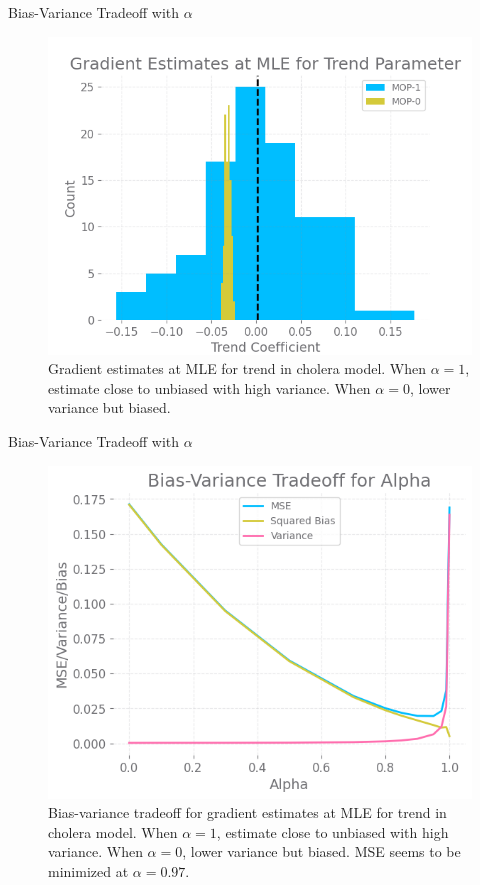 \documentclass{beamer}
\begin{document}
\begin{frame}{Bias-Variance Tradeoff with $\alpha$}
\begin{figure}
    \centering
    \includegraphics[scale=0.5]{imgs/mlegrad.png}
    \caption{Gradient estimates at MLE for trend in \cite{king08} cholera model. When $\alpha=1$, estimate close to unbiased with high variance. When $\alpha=0$, lower variance but biased.}
    \label{fig:bias-variance}
\end{figure}
    
\end{frame}

\begin{frame}{Bias-Variance Tradeoff with $\alpha$}
\begin{figure}
    \centering
    \includegraphics[scale=0.5]{imgs/095/biasvar.png}
    \caption{Bias-variance tradeoff for gradient estimates at MLE for trend in \cite{king08} cholera model. When $\alpha=1$, estimate close to unbiased with high variance. When $\alpha=0$, lower variance but biased. MSE seems to be minimized at $\alpha=0.97$.}
    \label{fig:bias-variance}
\end{figure}
    
\end{frame}
\end{document}
